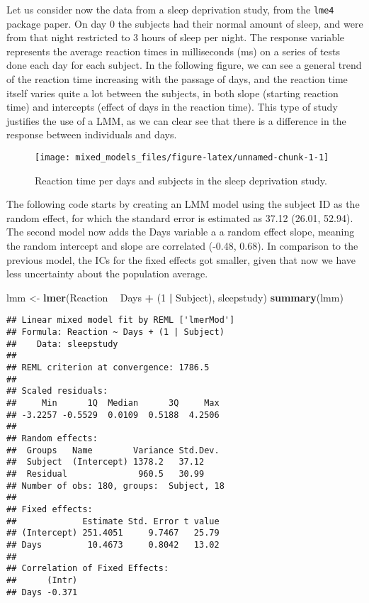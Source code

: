 \documentclass[]{article}
\newenvironment{Shaded}{\begin{snugshade}}{\end{snugshade}}
\newcommand{\DecValTok}[1]{\textcolor[rgb]{0.00,0.00,0.81}{#1}}
\newcommand{\KeywordTok}[1]{\textcolor[rgb]{0.13,0.29,0.53}{\textbf{#1}}}
\newcommand{\NormalTok}[1]{#1}
\newcommand{\OperatorTok}[1]{\textcolor[rgb]{0.81,0.36,0.00}{\textbf{#1}}}
\newcommand{\StringTok}[1]{\textcolor[rgb]{0.31,0.60,0.02}{#1}}
\begin{document}
Let us consider now the data from a sleep deprivation study, from the
\texttt{lme4} package paper. On day 0 the subjects had their normal
amount of sleep, and were from that night restricted to 3 hours of sleep
per night. The response variable represents the average reaction times
in milliseconds (ms) on a series of tests done each day for each
subject. In the following figure, we can see a general trend of the
reaction time increasing with the passage of days, and the reaction time
itself varies quite a lot between the subjects, in both slope (starting
reaction time) and intercepts (effect of days in the reaction time).
This type of study justifies the use of a LMM, as we can clear see that
there is a difference in the response between individuals and days.

\begin{figure}

{\centering \texttt{[image: mixed\_models\_files/figure-latex/unnamed-chunk-1-1]} 

}

\caption{Reaction time per days and subjects in the sleep deprivation study.}\label{fig:unnamed-chunk-1}
\end{figure}

The following code starts by creating an LMM model using the subject ID
as the random effect, for which the standard error is estimated as 37.12
(26.01, 52.94). The second model now adds the Days variable a a random
effect slope, meaning the random intercept and slope are correlated
(-0.48, 0.68). In comparison to the previous model, the ICs for the
fixed effects got smaller, given that now we have less uncertainty about
the population average.

\begin{Shaded}
\begin{Highlighting}[]
\NormalTok{lmm <-}\StringTok{ }\KeywordTok{lmer}\NormalTok{(Reaction }\OperatorTok{~}\StringTok{ }\NormalTok{Days }\OperatorTok{+}\StringTok{ }\NormalTok{(}\DecValTok{1} \OperatorTok{|}\StringTok{ }\NormalTok{Subject), sleepstudy)}
\KeywordTok{summary}\NormalTok{(lmm)}
\end{Highlighting}
\end{Shaded}

\begin{verbatim}
## Linear mixed model fit by REML ['lmerMod']
## Formula: Reaction ~ Days + (1 | Subject)
##    Data: sleepstudy
## 
## REML criterion at convergence: 1786.5
## 
## Scaled residuals: 
##     Min      1Q  Median      3Q     Max 
## -3.2257 -0.5529  0.0109  0.5188  4.2506 
## 
## Random effects:
##  Groups   Name        Variance Std.Dev.
##  Subject  (Intercept) 1378.2   37.12   
##  Residual              960.5   30.99   
## Number of obs: 180, groups:  Subject, 18
## 
## Fixed effects:
##             Estimate Std. Error t value
## (Intercept) 251.4051     9.7467   25.79
## Days         10.4673     0.8042   13.02
## 
## Correlation of Fixed Effects:
##      (Intr)
## Days -0.371
\end{verbatim}
\end{document}
